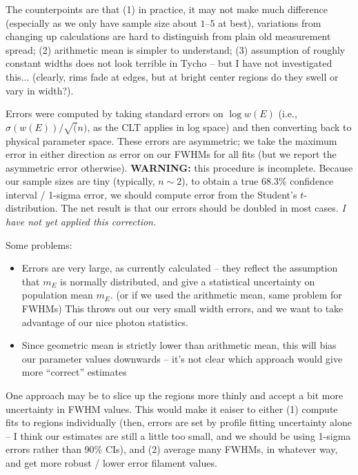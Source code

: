 \documentclass[12pt,preprint]{aastex}  %
\begin{document}
The counterpoints are that (1) in practice, it may not make much difference
(especially as we only have sample size about $1$--$5$ at best), variations
from changing up calculations are hard to distinguish from plain old
measurement spread; (2) arithmetic mean is simpler to understand; (3)
assumption of roughly constant widths does not look terrible in Tycho -- but I
have not investigated this... (clearly, rims fade at edges, but at bright
center regions do they swell or vary in width?).

Errors were computed by taking standard errors on $\log w(E)$
(i.e., $\sigma(w(E)) / \sqrt(n)$, as the CLT applies in log space) and then
converting back to physical parameter space.  These errors are asymmetric; we
take the maximum error in either direction as error on our FWHMs for all fits
(but we report the asymmetric error otherwise).
\textbf{WARNING:} this procedure is incomplete.  Because our sample sizes are
tiny (typically, $n \sim 2$), to obtain a true 68.3\% confidence interval /
1-sigma error, we should compute error from the Student's $t$-distribution.
The net result is that our errors should be doubled in most cases.
\emph{I have not yet applied this correction.}

Some problems:
\begin{itemize}
    \item Errors are very large, as currently calculated -- they reflect the
        assumption that $m_E$ is normally distributed, and give a statistical
        uncertainty on population mean $m_E$.
        (or if we used the arithmetic mean, same problem for FWHMs)
        This throws out our very small width errors, and we want to take
        advantage of our nice photon statistics.
    \item Since geometric mean is strictly lower than arithmetic mean,
        this will bias our parameter values downwards -- it's not clear which
        approach would give more ``correct'' estimates
\end{itemize}

One approach may be to slice up the regions more thinly and accept a bit more
uncertainty in FWHM values.  This would make it eaiser to either (1) compute
fits to regions individually (then, errors are set by profile fitting
uncertainty alone -- I think our estimates are still a little too small, and we
should be using 1-sigma errors rather than 90\% CIs), and (2) average many
FWHMs, in whatever way, and get more robust / lower error filament values.


\end{document}
